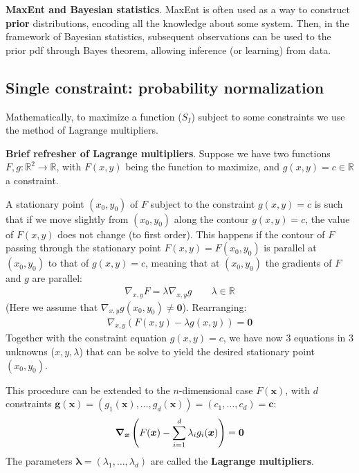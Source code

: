 \documentclass[../../main.tex]{subfiles}
\begin{document}
\begin{appr}\textbf{MaxEnt and Bayesian statistics}. MaxEnt is often used as a way to construct \textbf{prior} distributions, encoding all the  knowledge about some system. Then, in the framework of Bayesian statistics, subsequent observations can be used to  the prior pdf through Bayes theorem, allowing inference (or learning) from data.  
\end{appr}

\subsection{Single constraint: probability normalization}
Mathematically, to maximize a function ($S_I$) subject to some constraints we use the method of Lagrange multipliers.

\begin{expl}\textbf{Brief refresher of Lagrange multipliers}. Suppose we have two functions $F, g\colon \mathbb{R}^2 \to \mathbb{R}$, with $F(x,y)$ being the function to maximize, and $g(x,y) = c \in \mathbb{R}$ a constraint. 
    
A stationary point $(x_0,y_0)$ of $F$ subject to the constraint $g(x,y) = c$ is such that if we move slightly from $(x_0,y_0)$ along the contour $g(x,y) = c$, the value of $F(x,y)$ does not change (to first order). This happens if the contour of $F$ passing through the stationary point $F(x,y) = F(x_0, y_0)$ is parallel at $(x_0,y_0)$ to that of $g(x,y) = c$, meaning that at $(x_0, y_0)$ the gradients of $F$ and $g$ are parallel:
    \begin{align*}
        \nabla_{x,y} F = \lambda \nabla_{{x,y}} g \qquad \lambda \in \mathbb{R}
    \end{align*}
    (Here we assume that $\nabla_{x,y} g (x_0,y_0) \neq \bm{0}$). Rearranging:
    \begin{align*}
        \nabla_{x,y} (F(x,y) - \lambda g(x,y)) = \bm{0}
    \end{align*}
    Together with the constraint equation $g(x,y) = c$, we have now $3$ equations in $3$ unknowns ($x,y,\lambda$) that can be solve to yield the desired stationary point $(x_0, y_0)$.

    \medskip

    This procedure can be extended to the $n$-dimensional case $F(\bm{x})$, with $d$ constraints $\bm{g}(\bm{x}) = (g_1(\bm{x}), \dots, g_d(\bm{x})) = (c_1,\dots,c_d) = \bm{c}$:
    \begin{align*}
        \grad_{\bm{x}} \left(F(\bm{x}) - \sum_{i=1}^d \lambda_i g_i(\bm{x})\right) = \bm{0}
    \end{align*}
    The parameters $\bm{\lambda} = (\lambda_1, \dots, \lambda_d)$ are called the \textbf{Lagrange multipliers}.  
\end{expl}
\end{document}
